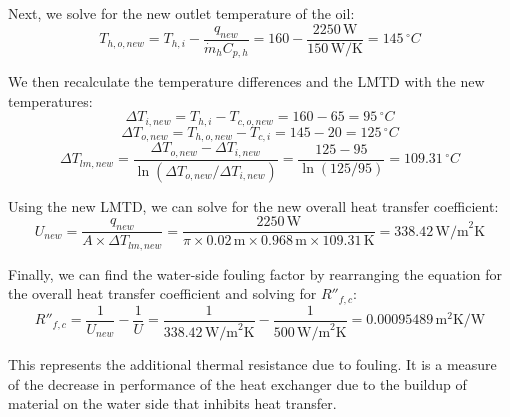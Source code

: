 \documentclass{article}
\numberwithin{equation}{section}
\begin{document}
Next, we solve for the new outlet temperature of the oil:
\begin{equation}
T_{h,o,new} = T_{h,i} - \frac{q_{new}}{\dot{m}_{h} C_{p,h}} = 160 - \frac{2250 \, \text{W}}{150 \, \text{W/K}} = 145 \, ^{\circ}C
\end{equation}

We then recalculate the temperature differences and the LMTD with the new temperatures:
\begin{equation}
\Delta T_{i,new} = T_{h,i} - T_{c,o,new} = 160 - 65 = 95 \, ^{\circ}C
\end{equation}
\begin{equation}
\Delta T_{o,new} = T_{h,o,new} - T_{c,i} = 145 - 20 = 125 \, ^{\circ}C
\end{equation}
\begin{equation}
\Delta T_{lm,new} = \frac{\Delta T_{o,new} - \Delta T_{i,new}}{\ln(\Delta T_{o,new}/\Delta T_{i,new})} = \frac{125 - 95}{\ln(125/95)} = 109.31 \, ^{\circ}C
\end{equation}

Using the new LMTD, we can solve for the new overall heat transfer coefficient:
\begin{equation}
U_{new} = \frac{q_{new}}{A \times \Delta T_{lm,new}} = \frac{2250 \, \text{W}}{\pi \times 0.02 \, \text{m} \times 0.968 \, \text{m} \times 109.31 \, \text{K}} = 338.42 \, \text{W/m}^2\text{K}
\end{equation}

Finally, we can find the water-side fouling factor by rearranging the equation for the overall heat transfer coefficient and solving for \( R''_{f,c} \):
\begin{equation}
R''_{f,c} = \frac{1}{U_{new}} - \frac{1}{U} = \frac{1}{338.42 \, \text{W/m}^2\text{K}} - \frac{1}{500 \, \text{W/m}^2\text{K}} = 0.00095489 \, \text{m}^2\text{K/W}
\end{equation}

This represents the additional thermal resistance due to fouling. It is a measure of the decrease in performance of the heat exchanger due to the buildup of material on the water side that inhibits heat transfer.
\end{document}
